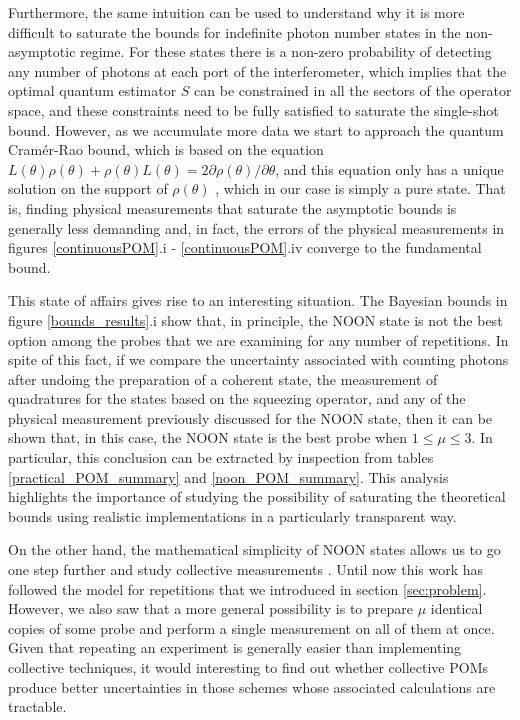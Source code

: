Furthermore, the same intuition can be used to understand why it is more difficult to saturate the bounds for indefinite photon number states in the non-asymptotic regime. For these states there is a non-zero probability of detecting any number of photons at each port of the interferometer, which implies that the optimal quantum estimator $S$ can be constrained in all the sectors of the operator space, and these constraints need to be fully satisfied to saturate the single-shot bound. However, as we accumulate more data we start to approach the quantum Cram\'{e}r-Rao bound, which is based on the equation $L(\theta) \rho(\theta) + \rho(\theta) L(\theta) = 2 \partial \rho(\theta)/\partial\theta$, and this equation only has a unique solution on the support of $\rho(\theta)$ \cite{genoni2008}, which in our case is simply a pure state. That is, finding physical measurements that saturate the asymptotic bounds is generally less demanding and, in fact, the errors of the physical measurements in figures \ref{continuousPOM}.i - \ref{continuousPOM}.iv converge to the fundamental bound. 

This state of affairs gives rise to an interesting situation. The Bayesian bounds in figure \ref{bounds_results}.i show that, in principle, the NOON state is not the best option among the probes that we are examining for any number of repetitions. In spite of this fact, if we compare the uncertainty associated with counting photons after undoing the preparation of a coherent state, the measurement of quadratures for the states based on the squeezing operator,  and any of the physical measurement previously discussed for the NOON state, then it can be shown that, in this case, the NOON state is the best probe when $1 \leqslant \mu \leqslant 3$. In particular, this conclusion can be extracted by inspection from tables \ref{practical_POM_summary} and \ref{noon_POM_summary}. This analysis highlights the importance of studying the possibility of saturating the theoretical bounds using realistic implementations in a particularly transparent way.

On the other hand, the mathematical simplicity of NOON states allows us to go one step further and study collective measurements \cite{jarzyna2015true, jarzyna2016thesis}. Until now this work has followed the model for repetitions that we introduced in section \ref{sec:problem}. However, we also saw that a more general possibility is to prepare $\mu$ identical copies of some probe and perform a single measurement on all of them at once. Given that repeating an experiment is generally easier than implementing collective techniques, it would interesting to find out whether collective POMs produce better uncertainties in those schemes whose associated calculations are tractable.


